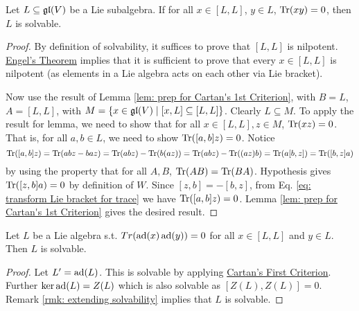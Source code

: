 \documentclass{article}
\begin{document}
\begin{theorem}\label{thm: Cartan's First Criterion}
    Let $L \subseteq \mathfrak{gl}(V)$ be a Lie subalgebra. If for all $x \in [L, L]$, $y \in L$, $\operatorname{Tr}(xy) = 0$, then $L$ is solvable.
\end{theorem}

\begin{proof}
    By definition of solvability, it suffices to prove that $[L, L]$ is nilpotent. \hyperref[thm: Engel]{Engel's Theorem} implies that it is sufficient to prove that every $x \in [L, L]$ is nilpotent (as elements in a Lie algebra acts on each other via Lie bracket).

    Now use the result of Lemma \ref{lem: prep for Cartan's 1st Criterion}, with $B = L$, $A = [L, L]$, with $M = \{ x \in \mathfrak{gl}(V) \mid [x, L] \subseteq [L, L] \}$. Clearly $L \subseteq M$. To apply the result for lemma, we need to show that for all $x \in [L, L], z \in M$, $\operatorname{Tr}(xz) = 0$. That is, for all $a, b \in L$, we need to show $\operatorname{Tr}([a, b] z) = 0$. Notice
    \begin{equation}\label{eq: transform Lie bracket for trace}
        \operatorname{Tr}([a, b]z) = \operatorname{Tr}(abz - baz) = \operatorname{Tr}(abz) - \operatorname{Tr}(b(az)) = \operatorname{Tr}(abz) - \operatorname{Tr}((az)b) = \operatorname{Tr}(a[b, z]) = \operatorname{Tr}([b, z]a)
    \end{equation}
    by using the property that for all $A, B$, $\operatorname{Tr}(AB) = \operatorname{Tr}(BA)$. Hypothesis gives $\operatorname{Tr}([z, b]a) = 0$ by definition of $W$. Since $[z, b] = -[b, z]$, from Eq. \eqref{eq: transform Lie bracket for trace} we have $\operatorname{Tr}([a, b]z) = 0$. Lemma \ref{lem: prep for Cartan's 1st Criterion} gives the desired result.
\end{proof}

\begin{corollary}
    Let $L$ be a Lie algebra s.t. $Tr(\operatorname{ad}(x) \operatorname{ad}(y)) = 0$ for all $x \in [L, L]$ and $y \in L$. Then $L$ is solvable.
\end{corollary}

\begin{proof}
    Let $L' = \operatorname{ad}(L)$. This is solvable by applying \hyperref[thm: Cartan's First Criterion]{Cartan's First Criterion}. Further $\ker \operatorname{ad}(L) = Z(L)$ which is also solvable as $[Z(L), Z(L)] = 0$. Remark \ref{rmk: extending solvability} implies that $L$ is solvable.
\end{proof}
\end{document}
